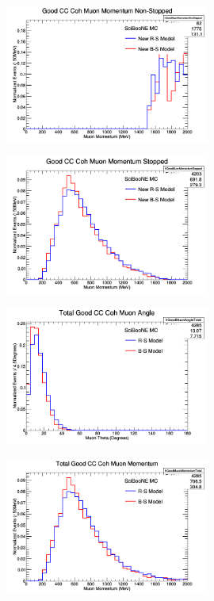 \documentclass[11pt]{article}
\begin{document}
\begin{figure}[H]
\centering
\includegraphics[width=0.6\textwidth]{ANMCombinedPlotsImages/9-ANMCombinedPlots.png}
\caption{}
\end{figure}

\begin{figure}[H]
\centering
\includegraphics[width=0.6\textwidth]{ANMCombinedPlotsImages/10-ANMCombinedPlots.png}
\caption{}
\end{figure}

\begin{figure}[H]
\centering
\includegraphics[width=0.6\textwidth]{ANMCombinedPlotsImages/11-ANMCombinedPlots.png}
\caption{}
\end{figure}

\begin{figure}[H]
\centering
\includegraphics[width=0.6\textwidth]{ANMCombinedPlotsImages/12-ANMCombinedPlots.png}
\caption{}
\end{figure}
\end{document}
